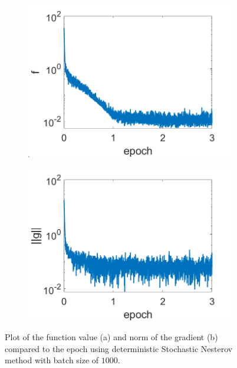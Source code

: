 \documentclass[12pt]{article}%
\begin{document}
\begin{figure}[H]
    \begin{subfigure}[b]{0.5\linewidth}
        \centering
        \includegraphics[width=\linewidth]{images/nest-f.png}
        \caption{}
        \label{nesterov:a}
        \vspace{4ex}
    \end{subfigure}%
    \begin{subfigure}[b]{0.5\linewidth}
        \centering
        \includegraphics[width=\linewidth]{images/nest-g.png}
        \caption{}
        \label{nesterov:b}
        \vspace{4ex}
    \end{subfigure}
    \caption{Plot of the function value (a) and norm of the gradient (b) compared to the epoch using deterministic Stochastic Nesterov method with batch size of $1000$.}
    \label{nesterov}
\end{figure}
\end{document}
